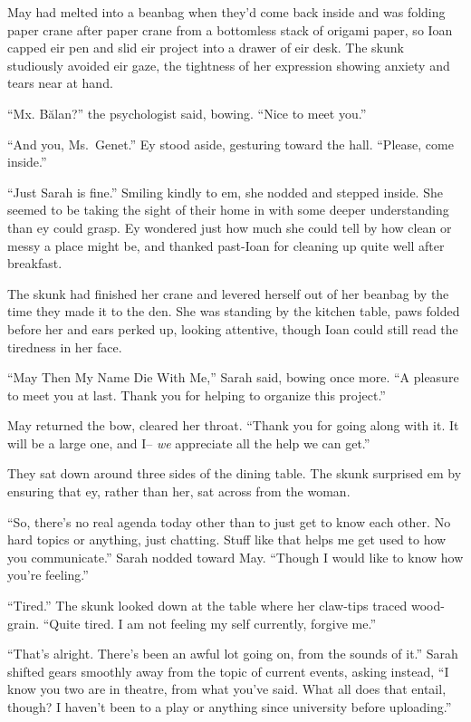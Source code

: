 May had melted into a beanbag when they'd come back inside and was folding paper crane after paper crane from a bottomless stack of origami paper, so Ioan capped eir pen and slid eir project into a drawer of eir desk. The skunk studiously avoided eir gaze, the tightness of her expression showing anxiety and tears near at hand.

``Mx. Bălan?'' the psychologist said, bowing. ``Nice to meet you.''

``And you, Ms.~Genet.'' Ey stood aside, gesturing toward the hall. ``Please, come inside.''

``Just Sarah is fine.'' Smiling kindly to em, she nodded and stepped inside. She seemed to be taking the sight of their home in with some deeper understanding than ey could grasp. Ey wondered just how much she could tell by how clean or messy a place might be, and thanked past-Ioan for cleaning up quite well after breakfast.

The skunk had finished her crane and levered herself out of her beanbag by the time they made it to the den. She was standing by the kitchen table, paws folded before her and ears perked up, looking attentive, though Ioan could still read the tiredness in her face.

``May Then My Name Die With Me,'' Sarah said, bowing once more. ``A pleasure to meet you at last. Thank you for helping to organize this project.''

May returned the bow, cleared her throat. ``Thank you for going along with it. It will be a large one, and I-- \emph{we} appreciate all the help we can get.''

They sat down around three sides of the dining table. The skunk surprised em by ensuring that ey, rather than her, sat across from the woman.

``So, there's no real agenda today other than to just get to know each other. No hard topics or anything, just chatting. Stuff like that helps me get used to how you communicate.'' Sarah nodded toward May. ``Though I would like to know how you're feeling.''

``Tired.'' The skunk looked down at the table where her claw-tips traced wood-grain. ``Quite tired. I am not feeling my self currently, forgive me.''

``That's alright. There's been an awful lot going on, from the sounds of it.'' Sarah shifted gears smoothly away from the topic of current events, asking instead, ``I know you two are in theatre, from what you've said. What all does that entail, though? I haven't been to a play or anything since university before uploading.''

